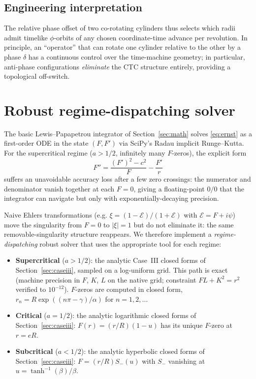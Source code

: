 \documentclass[11pt,a4paper]{article}
\begin{document}
\subsection{Engineering interpretation}

The relative phase offset of two co-rotating cylinders thus selects
which radii admit timelike $\phi$-orbits of any chosen
coordinate-time advance per revolution. In principle, an
``operator'' that can rotate one cylinder relative to the other by a
phase $\delta$ has a continuous control over the time-machine
geometry; in particular, anti-phase configurations \emph{eliminate}
the CTC structure entirely, providing a topological off-switch.

\section{Robust regime-dispatching solver}
\label{sec:robust}

The basic Lewis--Papapetrou integrator of Section~\ref{sec:math} solves
\eqref{eq:ernst} as a first-order ODE in the state $(F, F')$ via SciPy's
Radau implicit Runge--Kutta. For the supercritical regime
($a > 1/2$, infinitely many $F$-zeros), the explicit form
\begin{equation}
F'' = \frac{(F')^2 - c^2}{F} - \frac{F'}{r}
\end{equation}
suffers an unavoidable accuracy loss after a few zero crossings: the
numerator and denominator vanish together at each $F = 0$, giving a
floating-point $0/0$ that the integrator can navigate but only with
exponentially-decaying precision.

Naive Ehlers transformations (e.g. $\xi = (1 - \mathcal{E})/(1 +
\mathcal{E})$ with $\mathcal{E} = F + i \psi$) move the singularity
from $F = 0$ to $\lvert\xi\rvert = 1$ but do not eliminate it: the same
removable-singularity structure reappears. We therefore implement a
\emph{regime-dispatching} robust solver that uses the appropriate tool
for each regime:

\begin{itemize}[leftmargin=*]
\item \textbf{Supercritical} ($a > 1/2$): the analytic Case~III closed
forms of Section~\ref{sec:caseiii}, sampled on a log-uniform grid.
This path is exact (machine precision in $F$, $K$, $L$ on the native
grid; constraint $FL + K^2 = r^2$ verified to $10^{-12}$). $F$-zeros
are computed in closed form,
$r_n = R \exp((n\pi - \gamma)/\alpha)$ for $n = 1, 2, \ldots$
\item \textbf{Critical} ($a = 1/2$): the analytic logarithmic closed
forms of Section~\ref{sec:caseiii}: $F(r) = (r/R)(1 - u)$ has its
unique $F$-zero at $r = e R$.
\item \textbf{Subcritical} ($a < 1/2$): the analytic hyperbolic
closed forms of Section~\ref{sec:caseiii}: $F = (r/R) S_-(u)$ with
$S_-$ vanishing at $u = \tanh^{-1}(\beta)/\beta$.
\end{itemize}
\end{document}
